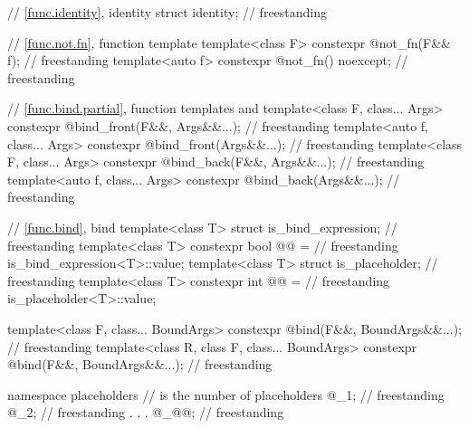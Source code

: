 \begin{codeblock}
{  // \ref{func.identity}, identity
  struct identity;                                                                  // freestanding

  // \ref{func.not.fn}, function template 
  template<class F> constexpr @\unspec@ not_fn(F&& f);                            // freestanding
  template<auto f> constexpr @\unspec@ not_fn() noexcept;                         // freestanding

  // \ref{func.bind.partial}, function templates  and 
  template<class F, class... Args>
    constexpr @\unspec@ bind_front(F&&, Args&&...);                               // freestanding
  template<auto f, class... Args>
    constexpr @\unspec@ bind_front(Args&&...);                                    // freestanding
  template<class F, class... Args>
    constexpr @\unspec@ bind_back(F&&, Args&&...);                                // freestanding
  template<auto f, class... Args>
    constexpr @\unspec@ bind_back(Args&&...);                                     // freestanding

  // \ref{func.bind}, bind
  template<class T> struct is_bind_expression;                                      // freestanding
  template<class T>
    constexpr bool @@ =                                           // freestanding
      is_bind_expression<T>::value;
  template<class T> struct is_placeholder;                                          // freestanding
  template<class T>
    constexpr int @@ =                                                // freestanding
      is_placeholder<T>::value;

  template<class F, class... BoundArgs>
    constexpr @\unspec@ bind(F&&, BoundArgs&&...);                                // freestanding
  template<class R, class F, class... BoundArgs>
    constexpr @\unspec@ bind(F&&, BoundArgs&&...);                                // freestanding

  namespace placeholders {
    //  is the  number of placeholders
    @\seebelownc@ _1;                                                                   // freestanding
    @\seebelownc@ _2;                                                                   // freestanding
               .
               .
               .
    @\seebelownc@ _@@;                                                                   // freestanding
  }

}
\end{codeblock}
